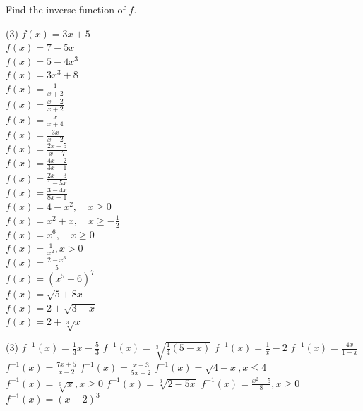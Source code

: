 \documentclass[12pt,fleqn]{book}
\newcommand{\prb}[1]{\begin{Exercise}#1\end{Exercise}}
\newcommand{\sol}[1]{\begin{Answer}#1\end{Answer}}
\begin{document}
\prb{
    Find the inverse function of $f$.
    \begin{tasks}(3)
        \task $f(x)=3 x+5$
        \\[2in]
        \task $f(x)=7-5 x$
        \\[2in]
        \task $f(x)=5-4 x^3$
        \\[2in]
        \task $f(x)=3 x^3+8$
        \\[2in]
        \task $f(x)=\frac{1}{x+2}$
        \\[2in]
        \task $\displaystyle f(x)=\frac{x-2}{x+2}$
        \\[2in]
        \task $\displaystyle f(x)=\frac{x}{x+4}$
        \\[2in]
        \task $\displaystyle f(x)=\frac{3 x}{x-2}$
        \\[2in]
        \task $\displaystyle f(x)=\frac{2 x+5}{x-7}$
        \\[2in]
        \task $\displaystyle f(x)=\frac{4 x-2}{3 x+1}$
        \\[2in]
        \task $\displaystyle f(x)=\frac{2 x+3}{1-5 x}$
        \\[2in]
        \task $\displaystyle f(x)=\frac{3-4 x}{8 x-1}$
        \\[2in]
        \task $f(x)=4-x^2, \quad x \geq 0$
        \\[2in]
        \task $f(x)=x^2+x, \quad x \geq-\frac{1}{2}$
        \\[2in]
        \task $f(x)=x^6, \quad x \geq 0$
        \\[2in]
        \task $f(x)=\frac{1}{x^2}, x>0$
        \\[2in]
        \task $f(x)=\frac{2-x^3}{5}$
        \\[2in]
        \task $f(x)=\left(x^5-6\right)^7$
        \\[2in]
        \task $f(x)=\sqrt{5+8 x}$
        \\[2in]
        \task $f(x)=2+\sqrt{3+x}$
        \\[2in]
        \task $f(x)=2+\sqrt[3]{x}$
        \\[2in]
    \end{tasks}
}
\sol{
    \begin{tasks}(3)
\task[a)] $f^{-1}(x)=\frac{1}{3} x-\frac{5}{3}$
\task[c)] $f^{-1}(x)=\sqrt[3]{\frac{1}{4}(5-x)}$
\task[e)] $f^{-1}(x)=\frac{1}{x}-2$
\task[g)] $f^{-1}(x)=\frac{4 x}{1-x}$
\task[i)] $f^{-1}(x)=\frac{7 x+5}{x-2}$
\task[k)] $f^{-1}(x)=\frac{x-3}{5 x+2}$
\task[m)] $f^{-1}(x)=\sqrt{4-x}, x \leq 4$
\task[o)] $f^{-1}(x)=\sqrt[6]{x}, x \geqslant 0$
\task[q)] $f^{-1}(x)=\sqrt[3]{2-5 x}$
\task[s)] $f^{-1}(x)=\frac{x^2-5}{8}, x \geq 0$
\task[t)] $f^{-1}(x)=(x-2)^3$
\end{tasks}
}
\end{document}

